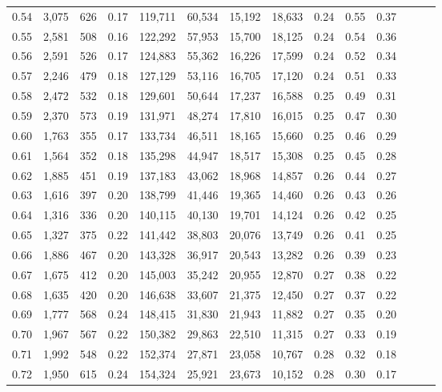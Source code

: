 \begin{tabular}{rrrrrrrrrrrrrr}
0.54 &  3,075 &  626 &  0.17 &  119,711 &   60,534 &  15,192 &  18,633 &  0.24 &  0.55 &      0.37 \\
0.55 &  2,581 &  508 &  0.16 &  122,292 &   57,953 &  15,700 &  18,125 &  0.24 &  0.54 &      0.36 \\
0.56 &  2,591 &  526 &  0.17 &  124,883 &   55,362 &  16,226 &  17,599 &  0.24 &  0.52 &      0.34 \\
0.57 &  2,246 &  479 &  0.18 &  127,129 &   53,116 &  16,705 &  17,120 &  0.24 &  0.51 &      0.33 \\
0.58 &  2,472 &  532 &  0.18 &  129,601 &   50,644 &  17,237 &  16,588 &  0.25 &  0.49 &      0.31 \\
0.59 &  2,370 &  573 &  0.19 &  131,971 &   48,274 &  17,810 &  16,015 &  0.25 &  0.47 &      0.30 \\
0.60 &  1,763 &  355 &  0.17 &  133,734 &   46,511 &  18,165 &  15,660 &  0.25 &  0.46 &      0.29 \\
0.61 &  1,564 &  352 &  0.18 &  135,298 &   44,947 &  18,517 &  15,308 &  0.25 &  0.45 &      0.28 \\
0.62 &  1,885 &  451 &  0.19 &  137,183 &   43,062 &  18,968 &  14,857 &  0.26 &  0.44 &      0.27 \\
0.63 &  1,616 &  397 &  0.20 &  138,799 &   41,446 &  19,365 &  14,460 &  0.26 &  0.43 &      0.26 \\
0.64 &  1,316 &  336 &  0.20 &  140,115 &   40,130 &  19,701 &  14,124 &  0.26 &  0.42 &      0.25 \\
0.65 &  1,327 &  375 &  0.22 &  141,442 &   38,803 &  20,076 &  13,749 &  0.26 &  0.41 &      0.25 \\
0.66 &  1,886 &  467 &  0.20 &  143,328 &   36,917 &  20,543 &  13,282 &  0.26 &  0.39 &      0.23 \\
0.67 &  1,675 &  412 &  0.20 &  145,003 &   35,242 &  20,955 &  12,870 &  0.27 &  0.38 &      0.22 \\
0.68 &  1,635 &  420 &  0.20 &  146,638 &   33,607 &  21,375 &  12,450 &  0.27 &  0.37 &      0.22 \\
0.69 &  1,777 &  568 &  0.24 &  148,415 &   31,830 &  21,943 &  11,882 &  0.27 &  0.35 &      0.20 \\
0.70 &  1,967 &  567 &  0.22 &  150,382 &   29,863 &  22,510 &  11,315 &  0.27 &  0.33 &      0.19 \\
0.71 &  1,992 &  548 &  0.22 &  152,374 &   27,871 &  23,058 &  10,767 &  0.28 &  0.32 &      0.18 \\
0.72 &  1,950 &  615 &  0.24 &  154,324 &   25,921 &  23,673 &  10,152 &  0.28 &  0.30 &      0.17 \\

\end{tabular}
